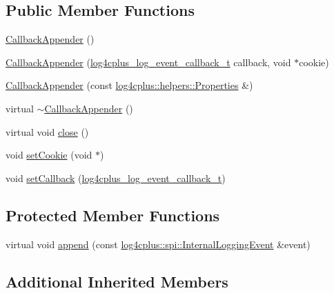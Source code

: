 \subsection*{Public Member Functions}
\begin{DoxyCompactItemize}
\item 
\hyperlink{classlog4cplus_1_1CallbackAppender_a53686410a72ccea417527e03c1a0d0c9}{Callback\-Appender} ()
\item 
\hyperlink{classlog4cplus_1_1CallbackAppender_aa335d0381ee108fa1aef6729aef42003}{Callback\-Appender} (\hyperlink{clogger_8h_a4cde3b53a57e3032534ac0a98f9cbca2}{log4cplus\-\_\-log\-\_\-event\-\_\-callback\-\_\-t} callback, void $\ast$cookie)
\item 
\hyperlink{classlog4cplus_1_1CallbackAppender_abde79638e12f898186544c2e11155da9}{Callback\-Appender} (const \hyperlink{classlog4cplus_1_1helpers_1_1Properties}{log4cplus\-::helpers\-::\-Properties} \&)
\item 
virtual \hyperlink{classlog4cplus_1_1CallbackAppender_a7eb05c02cbd09707e1375e0cf8b2c41d}{$\sim$\-Callback\-Appender} ()
\item 
virtual void \hyperlink{classlog4cplus_1_1CallbackAppender_aaa8882cb1d26bf6844f5a8422722ed1c}{close} ()
\item 
void \hyperlink{classlog4cplus_1_1CallbackAppender_af97809184528fc5b3f0747d04182d988}{set\-Cookie} (void $\ast$)
\item 
void \hyperlink{classlog4cplus_1_1CallbackAppender_a16234d6f16cf86add4fdad747e7b6e15}{set\-Callback} (\hyperlink{clogger_8h_a4cde3b53a57e3032534ac0a98f9cbca2}{log4cplus\-\_\-log\-\_\-event\-\_\-callback\-\_\-t})
\end{DoxyCompactItemize}
\subsection*{Protected Member Functions}
\begin{DoxyCompactItemize}
\item 
virtual void \hyperlink{classlog4cplus_1_1CallbackAppender_a72fa0ed95f0a5100dacf1ec958fe0c55}{append} (const \hyperlink{classlog4cplus_1_1spi_1_1InternalLoggingEvent}{log4cplus\-::spi\-::\-Internal\-Logging\-Event} \&event)
\end{DoxyCompactItemize}
\subsection*{Additional Inherited Members}


